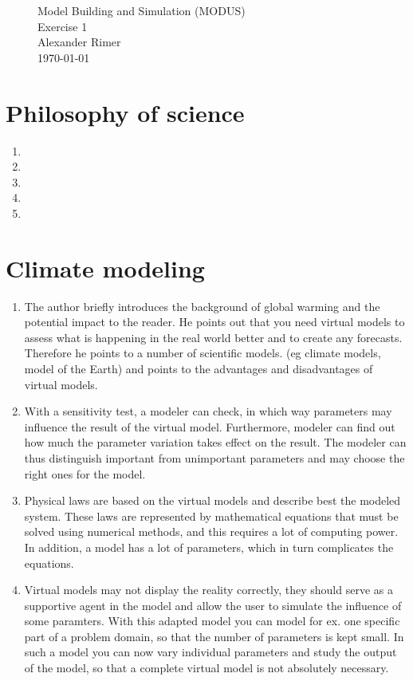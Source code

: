 \begin{figure}
\centering
{\Huge Model Building and Simulation (MODUS)}\\[0.5cm]
{\Huge Exercise 1}\\[0.5cm]
{\Large Alexander Rimer}\\[0.6cm]  
\today
\end{figure}

\section{Philosophy of science} 
\begin{enumerate}
	\item
	\item
	\item 
	\item
	\item
\end{enumerate}
\section{Climate modeling}
\begin{enumerate}
  \item The author briefly introduces the background of global warming and the potential impact to the reader.
  		He points out that you need virtual models to assess what is happening in the real world better and to 
  		create any forecasts. Therefore he  points to a number of scientific models. (eg climate models, model of the Earth) 
  		and points to the advantages and disadvantages of  virtual models. 
  		
  \item With a sensitivity test, a modeler can check, in which way parameters  may influence  the result of the virtual model.
 		Furthermore, modeler can find out how much the parameter variation takes effect on the result. The modeler can thus distinguish
 		important from unimportant parameters and may choose the right ones for the model. 
 		
  \item	Physical laws are based on the virtual models and describe best the modeled system. These laws are represented by mathematical equations that must be solved 
  		using numerical methods, and this requires a lot of computing power. In addition, a model has a lot of parameters, which in turn complicates the equations.
  
  \item Virtual  models may not display the reality correctly, they should serve as a supportive 
  		agent in the model and allow the user to simulate the influence of some paramters.
  		With this adapted model you can model for ex. one specific part of a problem domain, so that the number of parameters is kept small. 
  		In such a model  you can now vary individual parameters and study the output of the model, so that a complete virtual model is not absolutely necessary.
  
\end{enumerate}


